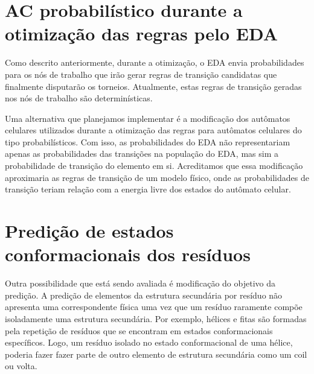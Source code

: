 %






\section{AC probabilístico durante a otimização das regras pelo EDA}

Como descrito anteriormente, durante a otimização, o EDA envia probabilidades para os nós de trabalho que irão gerar regras de transição candidatas que finalmente disputarão os torneios. Atualmente, estas regras de transição geradas nos nós de trabalho são determinísticas. 
 
Uma alternativa que planejamos implementar é a modificação dos autômatos celulares utilizados durante a otimização das regras para autômatos celulares do tipo probabilísticos. Com isso, as probabilidades do EDA não representariam apenas as probabilidades das transições na população do EDA, mas sim a probabilidade de transição do elemento em si. Acreditamos que essa modificação aproximaria as regras de transição de um modelo físico, onde as probabilidades de transição teriam relação com a energia livre dos estados do autômato celular. 





\section{Predição de estados conformacionais dos resíduos}

Outra possibilidade que está sendo avaliada é modificação do objetivo da predição. A predição de elementos da estrutura secundária por resíduo não apresenta uma correspondente física uma vez que um resíduo raramente compõe isoladamente uma estrutura secundária. Por exemplo, hélices e fitas são formadas pela repetição de resíduos que se encontram em estados conformacionais específicos. Logo, um resíduo isolado no estado conformacional de uma hélice, poderia fazer fazer parte de outro elemento de estrutura secundária como um coil ou volta.

